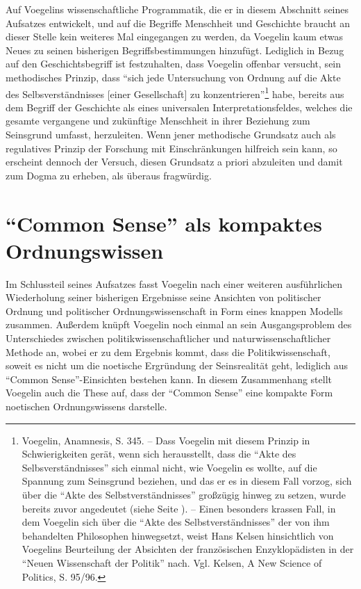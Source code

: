 Auf Voegelins wissenschaftliche Programmatik, die er in diesem Abschnitt
seines Aufsatzes entwickelt, und auf die Begriffe Menschheit und Geschichte
braucht an dieser Stelle kein weiteres Mal eingegangen zu werden, da Voegelin
kaum etwas Neues zu seinen bisherigen Begriffsbestimmungen hinzufügt.
Lediglich in Bezug auf den Geschichtsbegriff ist festzuhalten, dass Voegelin
offenbar versucht, sein methodisches Prinzip, dass "`sich jede Untersuchung
von Ordnung auf die Akte des Selbsverständnisses [einer Gesellschaft] zu
konzentrieren"'\footnote{Voegelin, Anamnesis, S. 345. -- Dass Voegelin mit
  diesem Prinzip in Schwierigkeiten gerät, wenn sich herausstellt, dass die
  "`Akte des Selbsverständnisses"' sich einmal nicht, wie Voegelin es wollte,
  auf die Spannung zum Seinsgrund beziehen, und das er es in diesem Fall
  vorzog, sich über die "`Akte des Selbstverständnisses"' großzügig hinweg zu
  setzen, wurde bereits zuvor angedeutet (siehe Seite
  \pageref{Selbstzeugnisse2}). -- Einen besonders krassen Fall, in dem
  Voegelin sich über die "`Akte des Selbstverständnisses"' der von ihm
  behandelten Philosophen hinwegsetzt, weist Hans Kelsen hinsichtlich von
  Voegelins Beurteilung der Absichten der französischen Enzyklopädisten in
  der "`Neuen Wissenschaft der Politik"' nach. Vgl. Kelsen, A New Science of
  Politics, S.  95/96. } habe, bereits aus dem Begriff der Geschichte als
eines universalen Interpretationsfeldes, welches die gesamte vergangene und
zukünftige Menschheit in ihrer Beziehung zum Seinsgrund umfasst, herzuleiten.
Wenn jener methodische Grundsatz auch als regulatives Prinzip der Forschung
mit Einschränkungen hilfreich sein kann, so erscheint dennoch der Versuch,
diesen Grundsatz a priori abzuleiten und damit zum Dogma zu erheben, als
überaus fragwürdig.

\section{"`Common Sense"' als kompaktes Ordnungswissen} 

Im Schlussteil seines Aufsatzes fasst Voegelin nach einer weiteren
ausführlichen Wiederholung seiner bisherigen Ergebnisse seine Ansichten von
politischer Ordnung und politischer Ordnungswissenschaft in Form eines knappen
Modells zusammen. Außerdem knüpft Voegelin noch einmal an sein
Ausgangsproblem des Unterschiedes zwischen politikwissenschaftlicher und
naturwissenschaftlicher Methode an, wobei er zu dem Ergebnis kommt, dass die
Politikwissenschaft, soweit es nicht um die noetische Ergründung der
Seinsrealität geht, lediglich aus "`Common Sense"'-Einsichten bestehen kann.
In diesem Zusammenhang stellt Voegelin auch die These auf, dass der "`Common
Sense"' eine kompakte Form noetischen Ordnungswissens darstelle.

